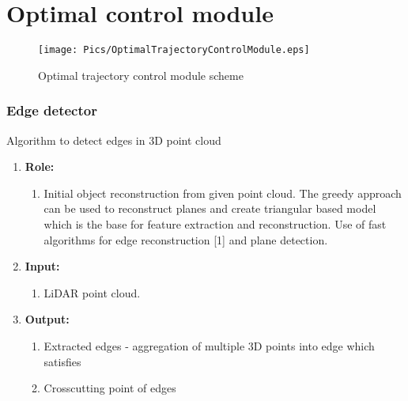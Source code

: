 \section{Optimal control module}\label{ch:OptimalControlModule}
\begin{figure}[h]
    \centering
    \texttt{[image: Pics/OptimalTrajectoryControlModule.eps]}
    \caption{Optimal trajectory control module scheme}
    \label{fig:OptimalTrajectoryControlModule}
\end{figure}

\subsubsection{Edge detector}
Algorithm to detect edges in 3D point cloud
\begin{enumerate}[]
	\item \textbf{Role:}
		\begin{enumerate}[]
		\item Initial object reconstruction from given point cloud. The greedy approach can be used to reconstruct planes and create triangular based model which is the base for feature extraction and reconstruction. Use of fast algorithms for edge reconstruction [1] and plane detection.
		\end{enumerate}
	\item \textbf{Input:}
		\begin{enumerate}[1.]
		\item LiDAR point cloud.
		\end{enumerate}	
	\item \textbf{Output:}
		\begin{enumerate}[1.]
		\item Extracted edges - aggregation of multiple 3D points into edge which satisfies 
		\item Crosscutting point of edges
		\end{enumerate}
\end{enumerate}
	
